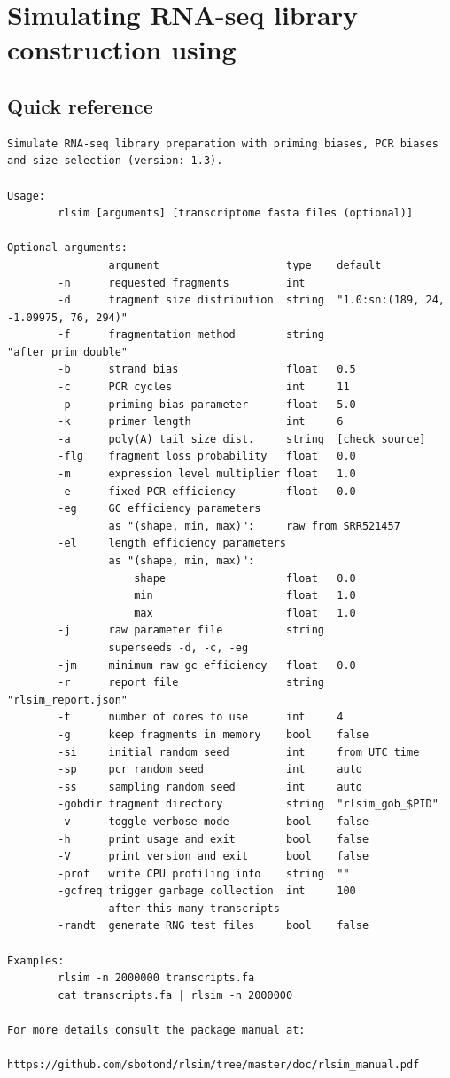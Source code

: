 \section{Simulating RNA-seq library construction using \rlsim}

\subsection{Quick reference}
\label{ss:qrlsim}

\begin{verbatim}
Simulate RNA-seq library preparation with priming biases, PCR biases and size selection (version: 1.3).

Usage:
        rlsim [arguments] [transcriptome fasta files (optional)]

Optional arguments:
                argument                    type    default  
        -n      requested fragments         int     
        -d      fragment size distribution  string  "1.0:sn:(189, 24, -1.09975, 76, 294)" 
        -f      fragmentation method        string  "after_prim_double"
        -b      strand bias                 float   0.5
        -c      PCR cycles                  int     11
        -p      priming bias parameter      float   5.0
        -k      primer length               int     6
        -a      poly(A) tail size dist.     string  [check source]
        -flg    fragment loss probability   float   0.0
        -m      expression level multiplier float   1.0
        -e      fixed PCR efficiency        float   0.0
        -eg     GC efficiency parameters 
                as "(shape, min, max)":     raw from SRR521457
        -el     length efficiency parameters 
                as "(shape, min, max)":
                    shape                   float   0.0
                    min                     float   1.0
                    max                     float   1.0
        -j      raw parameter file          string  
                superseeds -d, -c, -eg
        -jm     minimum raw gc efficiency   float   0.0
        -r      report file                 string  "rlsim_report.json"
        -t      number of cores to use      int     4
        -g      keep fragments in memory    bool    false
        -si     initial random seed         int     from UTC time
        -sp     pcr random seed             int     auto
        -ss     sampling random seed        int     auto
        -gobdir fragment directory          string  "rlsim_gob_$PID"
        -v      toggle verbose mode         bool    false
        -h      print usage and exit        bool    false
        -V      print version and exit      bool    false
        -prof   write CPU profiling info    string  ""
        -gcfreq trigger garbage collection  int     100
                after this many transcripts
        -randt  generate RNG test files     bool    false

Examples:
        rlsim -n 2000000 transcripts.fa
        cat transcripts.fa | rlsim -n 2000000

For more details consult the package manual at:
        https://github.com/sbotond/rlsim/tree/master/doc/rlsim_manual.pdf
\end{verbatim}

